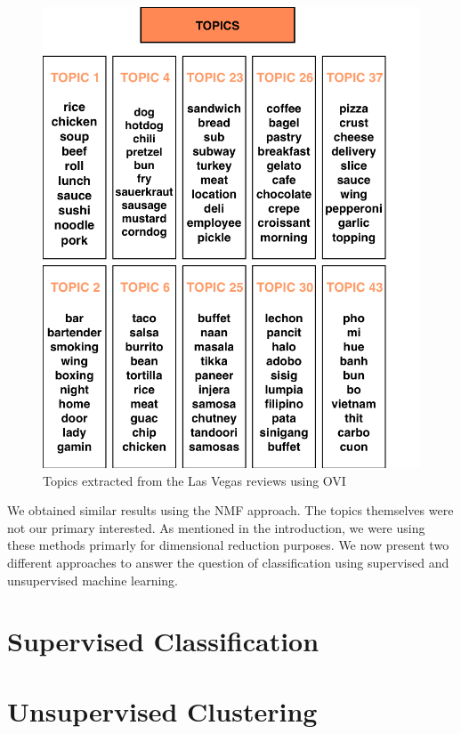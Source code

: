 \documentclass[twoside]{article}
\begin{document}
\begin{multicols}{2}
\begin{figure}[H]
\centering
\includegraphics[width=1\linewidth]{topics.png}
\caption{Topics extracted from the Las Vegas reviews using OVI}
\end{figure} 

\noindent We obtained similar results using the NMF approach. The topics themselves were not our primary interested. As mentioned in the introduction, we were using these methods primarly for dimensional reduction purposes. We now present two different approaches to answer the question of classification using supervised and unsupervised machine learning.\\

\section{Supervised Classification}

\section{Unsupervised Clustering}

\end{multicols}
\end{document}
